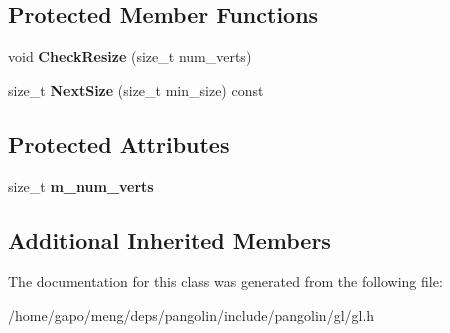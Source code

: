 \subsection*{Protected Member Functions}
\begin{DoxyCompactItemize}
\item 
void {\bfseries Check\+Resize} (size\+\_\+t num\+\_\+verts)\hypertarget{classpangolin_1_1_gl_sizeable_buffer_af67d5857f7abe03821d179e950e42c2e}{}\label{classpangolin_1_1_gl_sizeable_buffer_af67d5857f7abe03821d179e950e42c2e}

\item 
size\+\_\+t {\bfseries Next\+Size} (size\+\_\+t min\+\_\+size) const \hypertarget{classpangolin_1_1_gl_sizeable_buffer_ae2292e7462a51d6ba70ba2853dc6a03f}{}\label{classpangolin_1_1_gl_sizeable_buffer_ae2292e7462a51d6ba70ba2853dc6a03f}

\end{DoxyCompactItemize}
\subsection*{Protected Attributes}
\begin{DoxyCompactItemize}
\item 
size\+\_\+t {\bfseries m\+\_\+num\+\_\+verts}\hypertarget{classpangolin_1_1_gl_sizeable_buffer_ac91f98b629308b87ddad90f1ad471406}{}\label{classpangolin_1_1_gl_sizeable_buffer_ac91f98b629308b87ddad90f1ad471406}

\end{DoxyCompactItemize}
\subsection*{Additional Inherited Members}


The documentation for this class was generated from the following file\+:\begin{DoxyCompactItemize}
\item 
/home/gapo/meng/deps/pangolin/include/pangolin/gl/gl.\+h\end{DoxyCompactItemize}

